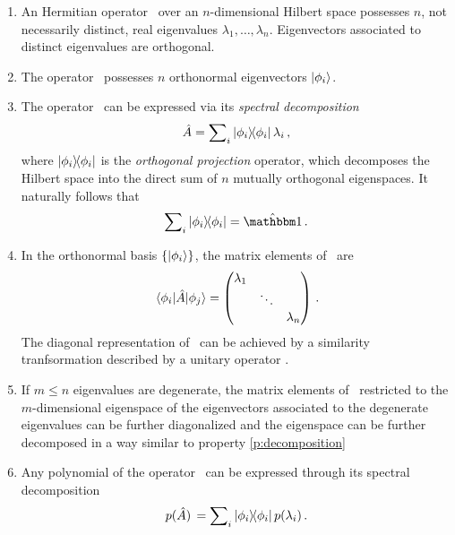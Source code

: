             \begin{enumerate}[label = \textit{\roman{enumi}}.]
                \item An Hermitian operator \hA\ over an $n$-dimensional Hilbert space possesses $n$, not necessarily distinct, real eigenvalues $\lambda_1,\ldots,\lambda_n$. Eigenvectors associated to distinct eigenvalues are orthogonal.
                \item The operator \hA\ possesses $n$ orthonormal eigenvectors $\ket{\phi_i}$.
                \item The operator \hA\ can be expressed via its \emph{spectral decomposition}
                    \begin{equation}
                        \label{eq:spectral-decomposition}
                        \hA = \sum\nolimits_i \dyad{\phi_i}{\phi_i}\lambda_i
                        \mycomma
                    \end{equation}
                    where $\dyad{\phi_i}{\phi_i}$ is the \emph{orthogonal projection} operator, which decomposes the Hilbert space into the direct sum of $n$ mutually orthogonal eigenspaces. It naturally follows that
                    \begin{equation}
                        \label{eq:completeness-of-identity}
                        \sum\nolimits_i \dyad{\phi_i}{\phi_i} = \hidM
                        \myperiod
                    \end{equation}
                    \label{p:decomposition}
                \item In the orthonormal basis $\qty{\ket{\phi_i}}$, the matrix elements of \hA\ are
                    \begin{equation*}
                        \mel{\phi_i}{\hA}{\phi_j} = \pmqty{\dmat{\lambda_1,\ddots,\lambda_n}}
                        \myperiod
                    \end{equation*}
                    The diagonal representation of \hA\ can be achieved by a similarity tranfsormation described by a unitary operator \hU.
                \item If $m \leq n$ eigenvalues are degenerate, the matrix elements of \hA\ restricted to the $m$-dimensional eigenspace of the eigenvectors associated to the degenerate eigenvalues can be further diagonalized and the eigenspace can be further decomposed in a way similar to property \ref{p:decomposition}
                \item Any polynomial of the operator \hA\ can be expressed through its spectral decomposition
                    \begin{equation}
                        \label{eq:polynomial-of-operator}
                        p\pqty*{\hA} = \sum\nolimits_i \dyad{\phi_i}{\phi_i} p\pqty{\lambda_i}
                        \myperiod
                    \end{equation}
            \end{enumerate}
